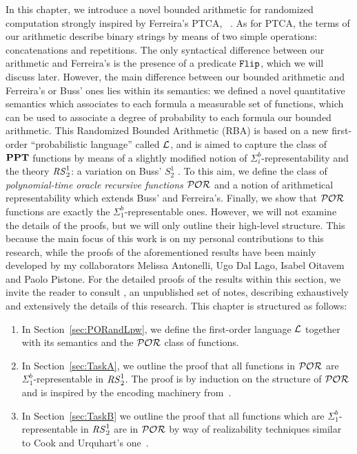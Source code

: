 In this chapter, we introduce a novel bounded arithmetic for randomized computation
strongly inspired by Ferreira's PTCA, ~\cite{Ferreira90}.
%
As for PTCA, the terms of our arithmetic describe binary strings by means of two simple operations: concatenations and repetitions. The only syntactical difference between our arithmetic and Ferreira's is the presence of a predicate $\mathtt{Flip}$, which we will discuss later.
%
However, the main difference between our bounded arithmetic and Ferreira's or Buss' ones lies within its semantics: we defined a novel quantitative semantics which associates to each formula a measurable set of functions, which can be used to associate a degree of probability to each formula our bounded arithmetic.
%
This Randomized Bounded Arithmetic (RBA) is based on a new first-order ``probabilistic language'' called $\mathcal{L}$,
and is aimed to capture the class of $\mathbf{PPT}$ functions by means of a slightly
modified notion of $\Sigma^b_i$-representability and the theory ${\mathit{RS}^1_2}$: a variation on Buss' $S^1_2$ \cite{Buss86}.
%
To this aim, we define the class of \emph{polynomial-time oracle recursive functions}
$\mathcal{POR}$ and a notion of arithmetical representability which extends Buss' and Ferreira's.
Finally, we show that $\mathcal{POR}$ functions are exactly the $\Sigma^b_1$-representable ones.
%
However, we will not examine the details of the proofs, but we will only
outline their high-level structure. This because the main focus of this work
is on my personal contributions to this research, while the proofs of the
aforementioned results have been mainly developed by my collaborators Melissa Antonelli, Ugo Dal Lago, Isabel Oitavem and Paolo Pistone.
%
For the detailed proofs of the results within this section, we invite the reader
to consult \cite{RBA}, an unpublished set of notes, describing exhaustively and
extensively the details of this research.
%
This chapter is structured as follows:

\begin{enumerate}
\itemsep0em
\item In Section~\ref{sec:PORandLpw}, we
define the first-order language $\mathcal{L}$ together with
its semantics and the $\mathcal{POR}$ class of functions.

\item In Section~\ref{sec:TaskA},
we outline the proof that all functions
in $\mathcal{POR}$ are $\Sigma^b_1$-representable
in ${\mathit{RS}^1_2}$.
The proof is by induction on the
structure of $\mathcal{POR}$ and is inspired
by the
encoding machinery
from~\cite{Buss86,Ferreira90}.

\item In Section~\ref{sec:TaskB}
we outline the proof that all functions which
are $\Sigma^b_1$-representable
in ${\mathit{RS}^1_2}$ are in $\mathcal{POR}$
by way of realizability techniques
similar to Cook and Urquhart's one~\cite{CookUrquhart}.
\end{enumerate}

